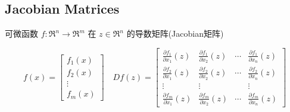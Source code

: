 \subsection{Jacobian Matrices}


\begin{definition}
    可微函数 $ f: \mathfrak{R}^{n} \rightarrow \mathfrak{R}^{m} $ 在 $ z \in \mathfrak{R}^{n} $ 的导数矩阵(Jacobian矩阵)

\begin{equation}
f(x)=\left[\begin{array}{c}
f_{1}(x) \\
f_{2}(x) \\
\vdots \\
f_{m}(x)
\end{array}\right] \quad D f(z)=\left[\begin{array}{cccc}
\frac{\partial f_{1}}{\partial x_{1}}(z) & \frac{\partial f_{1}}{\partial x_{2}}(z) & \cdots & \frac{\partial f_{1}}{\partial x_{n}}(z) \\
\frac{\partial f_{2}}{\partial x_{1}}(z) & \frac{\partial f_{2}}{\partial x_{2}}(z) & \cdots & \frac{\partial f_{2}}{\partial x_{n}}(z) \\
\vdots & \vdots & & \vdots \\
\frac{\partial f_{m}}{\partial x_{1}}(z) & \frac{\partial f_{m}}{\partial x_{2}}(z) & \cdots & \frac{\partial f_{m}}{\partial x_{n}}(z)
\end{array}\right]
\end{equation}
\end{definition}

